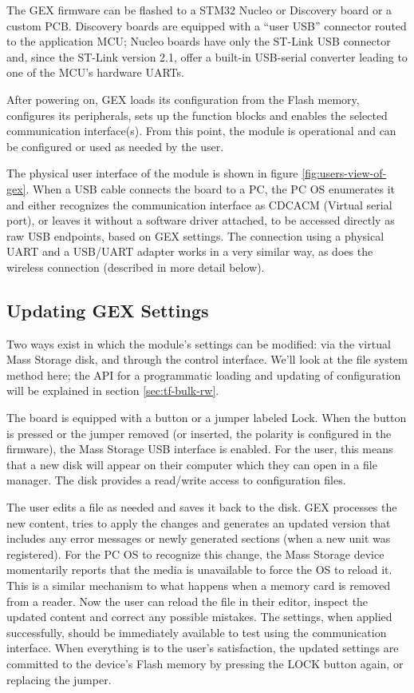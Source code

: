 The GEX firmware can be flashed to a STM32 Nucleo or Discovery board or a custom \gls{PCB}. Discovery boards are equipped with a ``user \gls{USB}'' connector routed to the application \gls{MCU}; Nucleo boards have only the ST-Link \gls{USB} connector and, since the ST-Link version 2.1, offer a built-in USB-serial converter leading to one of the \gls{MCU}'s hardware \glspl{UART}.

After powering on, GEX loads its configuration from the Flash memory, configures its peripherals, sets up the function blocks and enables the selected communication interface(s). From this point, the module is operational and can be configured or used as needed by the user.

The physical user interface of the module is shown in figure \ref{fig:users-view-of-gex}. When a \gls{USB} cable connects the board to a \gls{PC}, the \gls{PC} \gls{OS} enumerates it and either recognizes the communication interface as \gls{CDCACM} (Virtual serial port), or leaves it without a software driver attached, to be accessed directly as raw \gls{USB} endpoints, based on GEX settings.
The connection using a physical UART and a USB/UART adapter works in a very similar way, as does the wireless connection (described in more detail below).

\subsection{Updating GEX Settings}

Two ways exist in which the module's settings can be modified: via the virtual Mass Storage disk, and through the control interface. We'll look at the file system method here; the API for a programmatic loading and updating of configuration will be explained in section \ref{sec:tf-bulk-rw}.

The board is equipped with a button or a jumper labeled Lock. When the button is pressed or the jumper removed (or inserted, the polarity is configured in the firmware), the Mass Storage \gls{USB} interface is enabled. For the user, this means that a new disk will appear on their computer which they can open in a file manager. The disk provides a read/write access to configuration files. 

The user edits a file as needed and saves it back to the disk. GEX processes the new content, tries to apply the changes and generates an updated version that includes any error messages or newly generated sections (when a new unit was registered). For the \gls{PC} \gls{OS} to recognize this change, the Mass Storage device momentarily reports that the media is unavailable to force the \gls{OS} to reload it. This is a similar mechanism to what happens when a memory card is removed from a reader. Now the user can reload the file in their editor, inspect the updated content and correct any possible mistakes. The settings, when applied successfully, should be immediately available to test using the communication interface. When everything is to the user's satisfaction, the updated settings are committed to the device's Flash memory by pressing the LOCK button again, or replacing the jumper.

